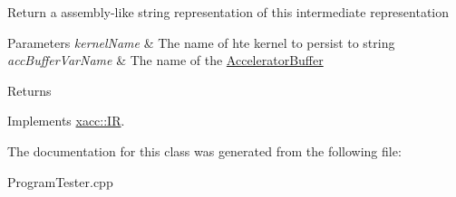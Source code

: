 Return a assembly-\/like string representation of this intermediate representation


\begin{DoxyParams}{Parameters}
{\em kernel\+Name} & The name of hte kernel to persist to string \\
\hline
{\em acc\+Buffer\+Var\+Name} & The name of the \hyperlink{a02444}{Accelerator\+Buffer} \\
\hline
\end{DoxyParams}
\begin{DoxyReturn}{Returns}

\end{DoxyReturn}


Implements \hyperlink{a02480_a8356cdff1919b88eabeb84fd7450cdb6}{xacc\+::\+IR}.



The documentation for this class was generated from the following file\+:\begin{DoxyCompactItemize}
\item 
Program\+Tester.\+cpp\end{DoxyCompactItemize}
